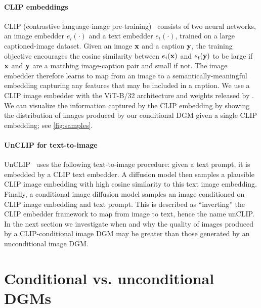 \paragraph{CLIP embeddings}
CLIP (contrastive language-image pre-training)~\citep{radford2021learning} consists of two neural networks, an image embedder $e_i(\cdot)$ and a text embedder $e_t(\cdot)$, trained on a large captioned-image dataset. Given an image ${\mathbf{x}}$ and a caption ${\mathbf{y}}$, the training objective encourages the cosine similarity between $e_i({\mathbf{x}})$ and $e_t({\mathbf{y}})$ to be large if ${\mathbf{x}}$ and ${\mathbf{y}}$ are a matching image-caption pair and small if not.
The image embedder therefore learns to map from an image to a semantically-meaningful embedding capturing any features that may be included in a caption. We use a CLIP image embedder with the ViT-B/32 architecture and weights released by \citet{radford2021learning}. We can visualize the information captured by the CLIP embedding by showing the distribution of images produced by our conditional DGM given a single CLIP embedding; see \cref{fig:samples}.

\paragraph{UnCLIP for text-to-image}
UnCLIP~\citep{ramesh2022hierarchical} uses the following text-to-image procedure: given a text prompt, it is embedded by a CLIP text embedder. A diffusion model then samples a plausible CLIP image embedding with high cosine similarity to this text image embedding. Finally, a conditional image diffusion model samples an image conditioned on CLIP image embedding and text prompt. This is described as ``inverting'' the CLIP embedder framework to map from image to text, hence the name unCLIP. In the next section we investigate when and why the quality of images produced by a CLIP-conditional image DGM may be greater than those generated by an unconditional image DGM.

\section{Conditional vs. unconditional DGMs} \label{sec:2sdm-cond-vs-uncond-dgms}
